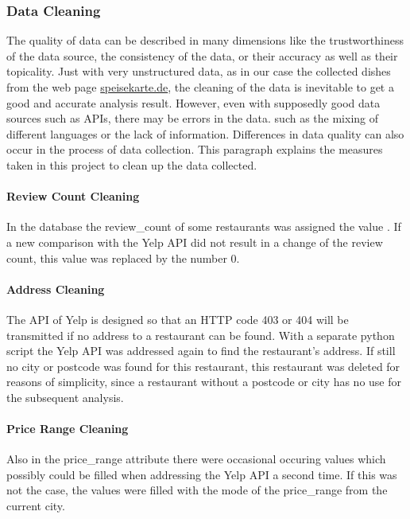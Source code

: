\subsubsection{Data Cleaning}
\label{subsubsec:cleaning}
The quality of data can be described in many dimensions like \zb{} the trustworthiness of the data source, the consistency of the data,
or their accuracy as well as their topicality.
Just with very unstructured data, as in our case the collected dishes from the web page \url{speisekarte.de}, the cleaning of the data is
inevitable to get a good and accurate analysis result.
However, even with supposedly good data sources such as \acp{API}, there may be errors in the data.
such as \zb{} the mixing of different languages or the lack of information.
Differences in data quality can also occur in the process of data collection.
\newline
This paragraph explains the measures taken in this project to clean up the data collected.
\paragraph{Review Count Cleaning}
In the \pg{} database the review\_count of some restaurants was assigned the value .
If a new comparison with the Yelp \ac{API} did not result in a change of the review count,
this  value was replaced by the number 0.
\paragraph{Address Cleaning}
The \ac{API} of Yelp is designed so that an HTTP code 403 or 404 will be transmitted if no address to a restaurant
can be found.
With a separate python script the Yelp \ac{API} was addressed again to find the restaurant's address.
If still no city or postcode was found for this restaurant, this restaurant was deleted for reasons of simplicity,
since a restaurant without a postcode or city has no use for the subsequent analysis.
\paragraph{Price Range Cleaning}
Also in the price\_range attribute there were occasional occuring  values which possibly could be filled when addressing the Yelp \ac{API} a second time.
If this was not the case, the  values were filled with the mode of the price\_range from the current city.
